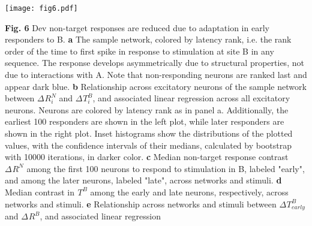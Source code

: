 \documentclass[pdflatex,referee,iicol,sn-basic]{sn-jnl}
\renewcommand{\R}[3][]{{}^{#1}_{}\!R^{#2}_{#3}}
\renewcommand{\T}[3][]{{}^{#1}_{}T^{#2}_{#3}}
\theoremstyle{thmstyleone}%
\theoremstyle{thmstyletwo}%
\theoremstyle{thmstylethree}%
\begin{document}
\begin{figure*}%
    \centering
    \texttt{[image: fig6.pdf]}
    \caption{}
    \label{fig6}
\end{figure*}
\textbf{Fig. 6} Dev non-target responses are reduced due to adaptation in early responders to B.
\textbf{a} The sample network, colored by latency rank, i.e. the rank order of the time to first spike in response to stimulation at site B in any sequence. The response develops asymmetrically due to structural properties, not due to interactions with A. Note that non-responding neurons are ranked last and appear dark blue.
\textbf{b} Relationship across excitatory neurons of the sample network between $\Delta \R{N}{i}$ and $\Delta \T{B}{i}$, and associated linear regression across all excitatory neurons. Neurons are colored by latency rank as in panel a. Additionally, the earliest 100 responders are shown in the left plot, while later responders are shown in the right plot. Inset histograms show the distributions of the plotted values, with the confidence intervals of their medians, calculated by bootstrap with 10000 iterations, in darker color.
\textbf{c} Median non-target response contrast $\Delta \R{N}{}$ among the first 100 neurons to respond to stimulation in B, labeled "early", and among the later neurons, labeled "late", across networks and stimuli.
\textbf{d} Median contrast in $\T{B}{}$ among the early and late neurons, respectively, across networks and stimuli.
\textbf{e} Relationship across networks and stimuli between $\Delta \T{B}{early}$ and $\Delta \R{B}{}$, and associated linear regression
\end{document}
